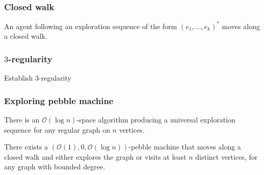 \documentclass{beamer}
\begin{document}
\begin{frame}
  \frametitle{Closed walk}
  \begin{mdframed}[linecolor=magenta]
    \begin{lemma}
      An agent following an exploration sequence of the form
      $(e_{1},\dots,e_{k})^{\ast}$ moves along a closed walk.
    \end{lemma}
  \end{mdframed}
\end{frame}

\begin{frame}
  \frametitle{$3$-regularity}
  \begin{mdframed}[linecolor=purple]
    Establish $3$-regularity
  \end{mdframed}
  \begin{center}
  \end{center}
\end{frame}

\begin{frame}
  \frametitle{Exploring pebble machine}
  \begin{mdframed}
    \begin{theorem}[Reingold]
      There is an $\mathcal{O}(\log n)$-space algorithm producing a universal
      exploration sequence for any regular graph on $n$ vertices.
    \end{theorem}
  \end{mdframed}
  \begin{center}
  \end{center}
  \begin{mdframed}
    \begin{theorem}
      There exists a $(\mathcal{O}(1), 0, \mathcal{O}(\log n))$-pebble machine
      that moves along a closed walk and either explores the graph or visits at
      least $n$ distinct vertices, for any graph with bounded degree.
    \end{theorem}
  \end{mdframed}
\end{frame}
\end{document}
